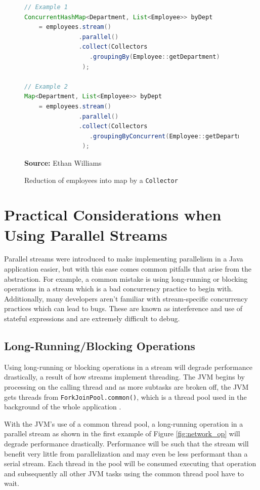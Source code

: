\documentclass[oneside, 12pt]{article}
\newcommand{\source}[1]{\textbf{Source:} {#1} }
\begin{document}
\begin{figure}[H]
\centering
\begin{lstlisting}[language=Java]
// Example 1
ConcurrentHashMap<Department, List<Employee>> byDept
    = employees.stream()
               .parallel()
               .collect(Collectors
                  .groupingBy(Employee::getDepartment)
                );
                
// Example 2
Map<Department, List<Employee>> byDept
    = employees.stream()
               .parallel()
               .collect(Collectors
                  .groupingByConcurrent(Employee::getDepartment)
                );
\end{lstlisting}
\caption{Reduction of employees into map by a {\tt Collector}}
\source{Ethan Williams}
\label{fig:employee_collection}
\end{figure}

\section{Practical Considerations when Using Parallel Streams}
Parallel streams were introduced to make implementing parallelism in a Java application easier, but with this ease comes common pitfalls that arise from the abstraction. For example, a common mistake is using long-running or blocking operations in a stream which is a bad concurrency practice to begin with. Additionally, many developers aren't familiar with stream-specific concurrency practices which can lead to bugs. These are known as  interference and use of stateful expressions and are extremely difficult to debug.

\subsection{Long-Running/Blocking Operations}
Using long-running or blocking operations in a stream will degrade performance drastically, a result of how streams implement threading. The JVM begins by processing on the calling thread and as more subtasks are broken off, the JVM gets threads from \verb|ForkJoinPool.common()|, which is a thread pool used in the background of the whole application \autocite{dzone_dangers}. 

With the JVM's use of a common thread pool, a long-running operation in a parallel stream as shown in the first example of Figure \ref{fig:network_op} will degrade performance drastically. Performance will be such that the stream will benefit very little from parallelization and may even be less performant than a serial stream. Each thread in the pool will be consumed executing that operation and subsequently all other JVM tasks using the common thread pool have to wait. 
\end{document}
